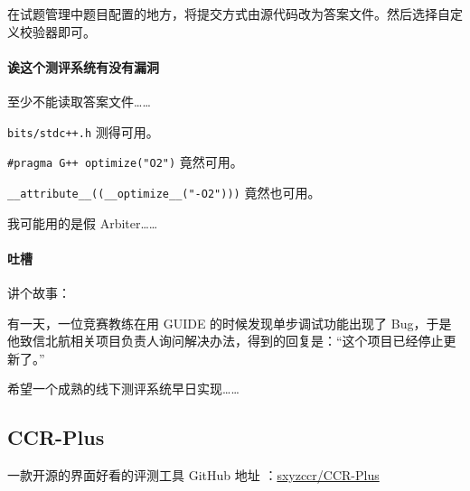 在试题管理中题目配置的地方，将提交方式由源代码改为答案文件。然后选择自定义校验器即可。

\paragraph{诶这个测评系统有没有漏洞}

至少不能读取答案文件……

\texttt{bits/stdc++.h} 测得可用。

\texttt{#pragma G++ optimize("O2")} 竟然可用。

\texttt{\_\_attribute__((_\_optimize__("-O2")))} 竟然也可用。

我可能用的是假 Arbiter……

\paragraph{吐槽}

讲个故事：

有一天，一位竞赛教练在用 GUIDE 的时候发现单步调试功能出现了 Bug，于是他致信北航相关项目负责人询问解决办法，得到的回复是：“这个项目已经停止更新了。”

希望一个成熟的线下测评系统早日实现……

\subsection{CCR-Plus}

一款开源的界面好看的评测工具 GitHub 地址 ：\href{https://github.com/sxyzccr/CCR-Plus}{sxyzccr/CCR-Plus}
